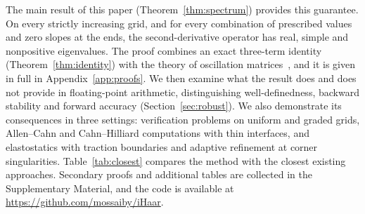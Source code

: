 \documentclass[smallextended,envcountsame]{svjour3}
\newcommand{\repo}{\url{https://github.com/mossaiby/iHaar}}
\begin{document}
The main result of this paper (Theorem~\ref{thm:spectrum}) provides this guarantee. On every strictly
increasing grid, and for every combination of prescribed values and zero slopes at the ends, the
second-derivative operator has real, simple and nonpositive eigenvalues. The proof combines an exact
three-term identity (Theorem~\ref{thm:identity}) with the theory of oscillation
matrices~\cite{gantmacher2002oscillation,fallat2011totally}, and it is given in full in
Appendix~\ref{app:proofs}. We then examine what the result does and does not provide in floating-point
arithmetic, distinguishing well-definedness, backward stability and forward accuracy
(Section~\ref{sec:robust}). We also demonstrate its consequences in three settings: verification problems on
uniform and graded grids, Allen--Cahn and Cahn--Hilliard computations with thin interfaces, and
elastostatics with traction boundaries and adaptive refinement at corner singularities.
Table~\ref{tab:closest} compares the method with the closest existing approaches. Secondary proofs and
additional tables are collected in the Supplementary Material, and the code is available at \repo.
\end{document}

